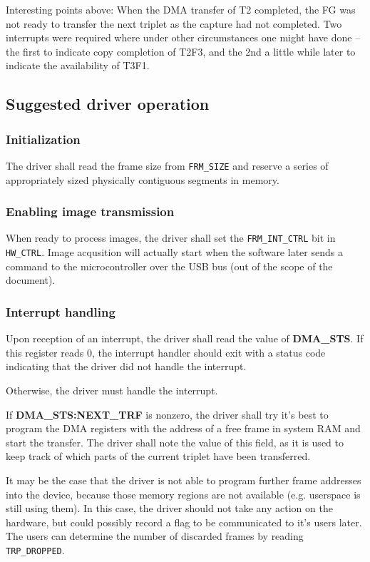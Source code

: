 \documentclass[12pt]{article}
\begin{document}
Interesting points above: When the DMA transfer of T2 completed, the FG was not ready to transfer the next triplet as the capture had not completed. Two interrupts were required where under other circumstances one might have done -- the first to indicate copy completion of T2F3, and the 2nd a little while later to indicate the availability of T3F1.

\subsection{Suggested driver operation}

\subsubsection{Initialization}

The driver shall read the frame size from \texttt{FRM\_SIZE} and reserve a series of appropriately sized physically contiguous segments in memory.

\subsubsection{Enabling image transmission}

When ready to process images, the driver shall set the \texttt{FRM\_INT\_CTRL} bit in \texttt{HW\_CTRL}. Image acqusition will actually start when the software later sends a command to the microcontroller over the USB bus (out of the scope of the document).

\subsubsection{Interrupt handling}

Upon reception of an interrupt, the driver shall read the value of \textbf{DMA\_STS}. If this register reads 0, the interrupt handler should exit with a status code indicating that the driver did not handle the interrupt.

Otherwise, the driver must handle the interrupt.

If \textbf{DMA\_STS:NEXT\_TRF} is nonzero, the driver shall try it's best to program the DMA registers with the address of a free frame in system RAM and start the transfer. The driver shall note the value of this field, as it is used to keep track of which parts of the current triplet have been transferred.

It may be the case that the driver is not able to program further frame addresses into the device, because those memory regions are not available (e.g. userspace is still using them). In this case, the driver should not take any action on the hardware, but could possibly record a flag to be communicated to it's users later. The users can determine the number of discarded frames by reading \texttt{TRP\_DROPPED}.
\end{document}
